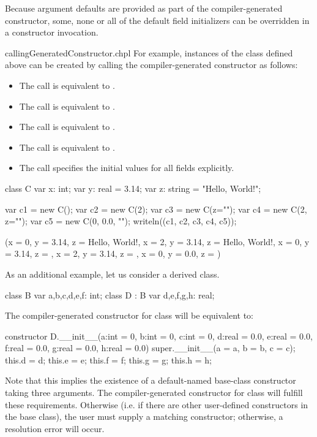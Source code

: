 Because argument defaults are provided as part of the compiler-generated
constructor, some, none or all of the default field initializers can be
overridden in a constructor invocation.

\begin{chapelexample}{callingGeneratedConstructor.chpl}
For example, instances of the class  defined above can be created by calling the compiler-generated constructor as follows:
\begin{itemize}
\item The call  is equivalent to .
\item The call  is equivalent to .
\item The call  is equivalent to .
\item The call  is equivalent to .
\item The call  specifies the initial values for all fields explicitly.
\end{itemize}
\begin{chapelpre}
class C {
  var x: int;
  var y: real = 3.14;
  var z: string = "Hello, World!";
}
\end{chapelpre}
\begin{chapelpost}
var c1 = new C();
var c2 = new C(2);
var c3 = new C(z="");
var c4 = new C(2, z="");
var c5 = new C(0, 0.0, "");
writeln((c1, c2, c3, c4, c5));
\end{chapelpost}
\begin{chapeloutput}
({x = 0, y = 3.14, z = Hello, World!}, {x = 2, y = 3.14, z = Hello, World!}, {x = 0, y = 3.14, z = }, {x = 2, y = 3.14, z = }, {x = 0, y = 0.0, z = })
\end{chapeloutput}
\end{chapelexample}

\begin{example}
As an additional example, let us consider a derived class.
\begin{chapel}
class B {
  var a,b,c,d,e,f: int;
}
class D : B {
  var d,e,f,g,h: real;
}
\end{chapel}
The compiler-generated constructor for class  will be equivalent to:
\begin{chapel}
constructor D.__init__(a:int = 0, b:int = 0, c:int = 0, 
                       d:real = 0.0, e:real = 0.0, f:real = 0.0, 
                       g:real = 0.0, h:real = 0.0)
{ super.__init__(a = a, b = b, c = c);
  this.d = d; this.e = e; this.f = f; this.g = g; this.h = h; }
\end{chapel}
Note that this implies the existence of a default-named base-class constructor
taking three arguments.  The compiler-generated constructor for class  will fulfill these
requirements.  Otherwise (i.e. if there are other user-defined constructors
in the base class), the user must supply a matching constructor; otherwise, a resolution
error will occur.
\end{example}

